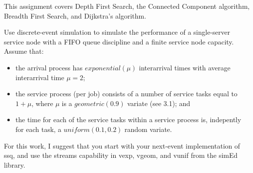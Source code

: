 \documentclass[11pt,addpoints,answers]{exam}
\begin{document}
\pagestyle{head}                %

\noindent 
This assignment covers Depth First Search, the Connected Component algorithm,
Breadth First Search, and Dijkstra's algorithm.
\\

\begin{questions}

  \question 
  Use discrete-event simulation to simulate the performance of a single-server
  service node with a FIFO queue discipline and a finite service node capacity.
  Assume that:
  \begin{itemize}
    \item the arrival process has $exponential(\mu)$ interarrival times with
      average interarrival time $\mu = 2$;
    \item the service process (per job) consists of a number of service tasks
      equal to $1 + \mu$, where $\mu$ is a $geometric(0.9)$ variate (see 3.1); and
    \item the time for each of the service tasks within a service process is,
      indepently for each task, a $uniform(0.1, 0.2)$ random variate.
  \end{itemize}
  For this work, I suggest that you start with your next-event implementation
  of ssq, and use the streams capability in vexp, vgeom, and vunif from the
  simEd library.

\end{questions}
\end{document}
